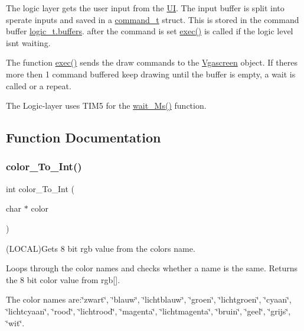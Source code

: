 The logic layer get\textquotesingle{}s the user input from the \mbox{\hyperlink{namespace_u_i}{UI}}. The input buffer is split into sperate inputs and saved in a \mbox{\hyperlink{struct_l_l_1_1command__t}{command\+\_\+t}} struct. This is stored in the command buffer \mbox{\hyperlink{struct_l_l_1_1logic__t_a09663354d4cddc7fc94fce6d60c2a9a2}{logic\+\_\+t.\+buffers}}. after the command is set \mbox{\hyperlink{namespace_l_l_ac98bc19f4e3468b76cfc2e43456527cc}{exec()}} is called if the logic level isn\textquotesingle{}t waiting.

The function \mbox{\hyperlink{namespace_l_l_ac98bc19f4e3468b76cfc2e43456527cc}{exec()}} sends the draw commands to the \mbox{\hyperlink{class_vgascreen}{Vgascreen}} object. If there\textquotesingle{}s more then 1 command buffered keep drawing until the buffer is empty, a wait is called or a repeat.

The Logic-\/layer uses T\+I\+M5 for the \mbox{\hyperlink{namespace_l_l_ab30bdedb41438098df71bea7d5eb624d}{wait\+\_\+\+Ms()}} function. 

\subsection{Function Documentation}
\mbox{\label{namespace_l_l_af61e12d8feebbbdb330c2405c305840b}} 
\subsubsection{\texorpdfstring{color\+\_\+\+To\+\_\+\+Int()}{color\_To\_Int()}}
{\footnotesize\ttfamily int color\+\_\+\+To\+\_\+\+Int (\begin{DoxyParamCaption}\item[{char $\ast$}]{color }\end{DoxyParamCaption})}



(L\+O\+C\+AL)Gets 8 bit rgb value from the colors name. 

Loops through the color names and checks whether a name is the same. Returns the 8 bit color value from rgb\mbox{[}\mbox{]}.

The color names are\+:\char`\"{}zwart\char`\"{}, \char`\"{}blauw\char`\"{}, \char`\"{}lichtblauw\char`\"{}, \char`\"{}groen\char`\"{}, \char`\"{}lichtgroen\char`\"{}, \char`\"{}cyaan\char`\"{}, \char`\"{}lichtcyaan\char`\"{}, \char`\"{}rood\char`\"{}, \char`\"{}lichtrood\char`\"{}, \char`\"{}magenta\char`\"{}, \char`\"{}lichtmagenta\char`\"{}, \char`\"{}bruin\char`\"{}, \char`\"{}geel\char`\"{}, \char`\"{}grijs\char`\"{}, \char`\"{}wit\char`\"{}.


